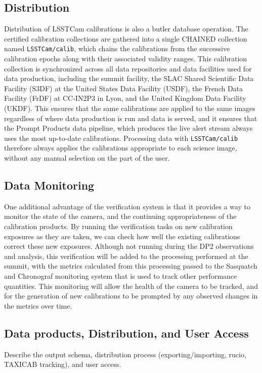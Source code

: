 \subsection{Distribution} \label{sec:verify-accept-certify:distribution}
Distribution of LSSTCam calibrations is also a butler database operation. The certified calibration collections are gathered into a single CHAINED collection named \texttt{LSSTCam/calib}, which chains the calibrations from the successive calibration epochs along with their associated validity ranges.
This calibration collection is synchronized across all data repositories and data facilities used for data production, including the summit facility, the SLAC Shared Scientific Data Facility (S3DF) at the United States Data Facility (USDF), the French Data Facility (FrDF) at CC-IN2P3 in Lyon, and the United Kingdom Data Facility (UKDF).
This ensures that the same calibrations are applied to the same images regardless of where data production is run and data is served, and it ensures that the Prompt Products data pipeline, which produces the live alert stream always uses the most up-to-date calibrations.
Processing data with \texttt{LSSTCam/calib} therefore always applies the calibrations appropriate to each science image, without any manual selection on the part of the user.

\subsection{Data Monitoring} \label{sec:verify-accept-certify:data-monitoring}
One additional advantage of the verification system is that it provides a way to monitor the state of the camera, and the continuing appropriateness of the calibration products.
By running the verification tasks on new calibration exposures as they are taken, we can check how well the existing calibrations correct these new exposures.
Although not running during the DP2 observations and analysis, this verification will be added to the processing performed at the summit, with the metrics calculated from this processing passed to the Sasquatch and Chronograf monitoring system that is used to track other performance quantities.
This monitoring will allow the health of the camera to be tracked, and for the generation of new calibrations to be prompted by any observed changes in the metrics over time.

\subsection{Data products, Distribution, and User Access} \label{sec:verify-accept-certify:data-products}
Describe the output schema, distribution process (exporting/importing, rucio, TAXICAB tracking), and user access.

